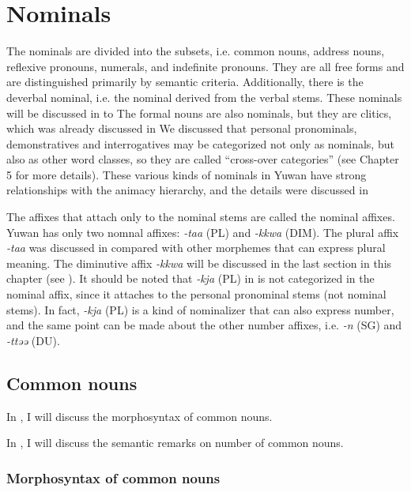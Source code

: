 \chapter{Nominals}\label{chap:7}

The nominals are divided into the subsets, i.e. common nouns, address nouns, reflexive pronouns, numerals, and indefinite pronouns. They are all free forms and are distinguished primarily by semantic criteria. Additionally, there is the deverbal nominal, i.e. the nominal derived from the verbal stems. These nominals will be discussed in  to  The formal nouns are also nominals, but they are clitics, which was already discussed in  We discussed that personal pronominals, demonstratives and interrogatives may be categorized not only as nominals, but also as other word classes, so they are called “cross-over categories” (see Chapter 5 for more details). These various kinds of nominals in Yuwan have strong relationships with the animacy hierarchy, and the details were discussed in 

The affixes that attach only to the nominal stems are called the nominal affixes. Yuwan has only two nomnal affixes: \textit{{}-taa} (PL) and \textit{{}-kkwa} (DIM). The plural affix \textit{{}-taa} was discussed in  compared with other morphemes that can express plural meaning. The diminutive affix \textit{{}-kkwa} will be discussed in the last section in this chapter (see ). It should be noted that \textit{{}-kja} (PL) in  is not categorized in the nominal affix, since it attaches to the personal pronominal stems (not nominal stems). In fact, \textit{{}-kja} (PL) is a kind of nominalizer that can also express number, and the same point can be made about the other number affixes, i.e. \textit{{}-n} (SG) and \textit{{}-ttəə} (DU).

\section{Common nouns}

In , I will discuss the morphosyntax of common nouns.

In , I will discuss the semantic remarks on number of common nouns.

\subsection{Morphosyntax of common nouns}

